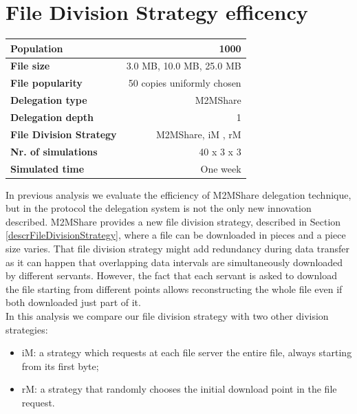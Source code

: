 \section{File Division Strategy efficency}
\begin{table}[h]
\begin{center}
\begin{tabular}{|l|r|}
\hline
\bfseries Population & 1000 \\
\hline
\bfseries File size & 3.0 MB, 10.0 MB, 25.0 MB \\
\hline
\bfseries File popularity & 50 copies uniformly chosen \\
\hline
\bfseries Delegation type & M2MShare \\
\hline
\bfseries Delegation depth & 1 \\
\hline
\bfseries File Division Strategy & M2MShare, iM , rM \\
\hline
\bfseries Nr. of simulations & 40 x 3 x 3\\
\hline
\bfseries Simulated time & One week \\
\hline
\end{tabular}
\end{center}
\end{table}
In previous analysis we evaluate the efficiency of M2MShare delegation technique, but in the protocol the delegation system is not the only new innovation described. M2MShare provides a new file division strategy, described in Section \ref{descrFileDivisionStrategy}, where a file can be downloaded in pieces and a piece size varies. That file division strategy might add redundancy during data transfer as it can happen that overlapping data intervals are simultaneously downloaded by different servants. However, the fact that each servant is asked to download the file starting from different points allows reconstructing the whole file even if both downloaded just part of it. \\
In this analysis we compare our file division strategy with two other division strategies:
\begin{itemize}
\item iM: a strategy which requests at each file server the
entire file, always starting from its first byte;
\item rM: a strategy that randomly chooses the initial
download point in the file request.
\end{itemize}


